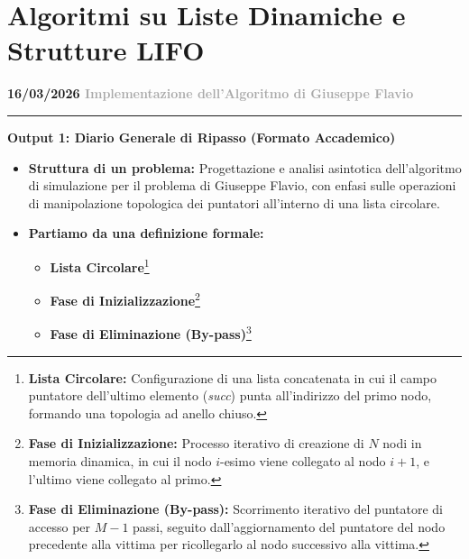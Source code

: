 \documentclass[a4paper, 11pt]{report}
\newcommand{\lezione}[2]{
\vspace{2em}
\noindent\textbf{\Large #1 \hfill \textcolor{darkgray}{#2}}
\vspace{0.5em}
\hrule
\vspace{1.5em}
}
\newcommand{\definizione}[2]{%
\textbf{#1}\footnote{\textbf{#1:} #2}%
}
\begin{document}
\chapter{Algoritmi su Liste Dinamiche e Strutture LIFO}

\lezione{16/03/2026}{Implementazione dell'Algoritmo di Giuseppe Flavio}

\vspace{0.5cm}
\textbf{Output 1: Diario Generale di Ripasso (Formato Accademico)}

\begin{itemize}
    \item \textbf{Struttura di un problema:}
    Progettazione e analisi asintotica dell'algoritmo di simulazione per il problema di Giuseppe Flavio, con enfasi sulle operazioni di manipolazione topologica dei puntatori all'interno di una lista circolare.

    \item \textbf{Partiamo da una definizione formale:}
    \begin{itemize}
        \item \definizione{Lista Circolare}{Configurazione di una lista concatenata in cui il campo puntatore dell'ultimo elemento (\textit{succ}) punta all'indirizzo del primo nodo, formando una topologia ad anello chiuso.}
        \item \definizione{Fase di Inizializzazione}{Processo iterativo di creazione di $N$ nodi in memoria dinamica, in cui il nodo $i$-esimo viene collegato al nodo $i+1$, e l'ultimo viene collegato al primo.}
        \item \definizione{Fase di Eliminazione (By-pass)}{Scorrimento iterativo del puntatore di accesso per $M-1$ passi, seguito dall'aggiornamento del puntatore del nodo precedente alla vittima per ricollegarlo al nodo successivo alla vittima.}
    \end{itemize}


\end{itemize}
\end{document}
